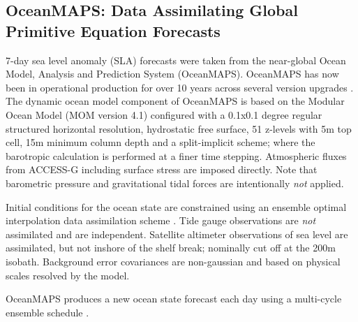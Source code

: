 \subsection{OceanMAPS: Data Assimilating Global Primitive Equation Forecasts }
\label{sec:oceanmaps}
7-day sea level anomaly (SLA) forecasts were taken from the near-global Ocean Model, Analysis and Prediction System (OceanMAPS).
OceanMAPS has now been in operational production for over 10 years across several version upgrades  
\citep{Brassington:2007ut,NMOC:2007wq,BureauofMeterology:2011ta,Brassington:2012wm}.
The dynamic ocean model component of OceanMAPS is based on the Modular Ocean Model (MOM version 4.1) \citep{Griffies:2008vh} configured with a 0.1x0.1 degree regular structured horizontal resolution, hydrostatic free surface, 51 z-levels with 5m top cell, 15m minimum column depth and a split-implicit scheme; where the barotropic calculation is performed at a finer time stepping. 
Atmospheric fluxes from ACCESS-G including surface stress are imposed directly.
Note that barometric pressure and gravitational tidal forces are intentionally \textit{not} applied.

Initial conditions for the ocean state are constrained using an ensemble optimal interpolation data assimilation scheme \citep{Oke:2008wr, sakov:2014}. 
Tide gauge observations are \textit{not} assimilated and are independent.   
Satellite altimeter observations of sea level are assimilated, but not inshore of the shelf break; nominally cut off at the 200m isobath. 
Background error covariances are non-gaussian and based on physical scales resolved by the model.

OceanMAPS produces a new ocean state forecast each day using a multi-cycle ensemble schedule \citep{GaryBBrassington:2013jw}.

